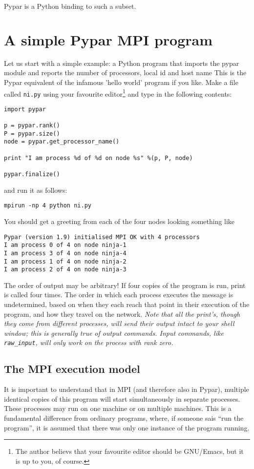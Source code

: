 \documentclass[12pt]{article}
\begin{document}
Pypar is a Python binding to such a subset.


\section{A simple Pypar MPI program}
Let us start with a simple example: a Python program 
that imports the pypar module and 
reports the number of processors, local id and host name
This is the Pypar equivalent of the infamous 'hello world' 
program if you like. 
Make a file called \texttt{ni.py} using your favourite
editor\footnote{The author believs that your favourite editor should 
be GNU/Emacs, but it is up to you, of course.}
and type in the following contents:
{\footnotesize
\begin{verbatim}
import pypar

p = pypar.rank()
P = pypar.size()
node = pypar.get_processor_name()

print "I am process %d of %d on node %s" %(p, P, node)

pypar.finalize()
\end{verbatim}}
\noindent and run it as follows:
\begin{verbatim}
mpirun -np 4 python ni.py
\end{verbatim}
You should get a greeting from each of the four nodes looking 
something like
\begin{verbatim}
Pypar (version 1.9) initialised MPI OK with 4 processors
I am process 0 of 4 on node ninja-1
I am process 3 of 4 on node ninja-4
I am process 1 of 4 on node ninja-2
I am process 2 of 4 on node ninja-3
\end{verbatim}
The order of output may be arbitrary!  If four copies of the
program is run, print is called four times. The order in which each
process executes the message is undetermined, based on when they each
reach that point in their execution of the program, and how they
travel on the network.
\emph{Note that all the print's, though they come from different
  processes, will send their output intact to your shell window; this
  is generally true of output commands.
  Input commands, like \texttt{raw_input},
  will only work on the process with rank zero.}

  
\subsection{The MPI execution model}

It is important to understand that in MPI (and therefore also in 
Pypar), multiple identical copies of this program 
will start simultaneously in separate processes.
These processes may run on one machine or on multiple machines.
This is a fundamental difference from ordinary programs, 
where, if someone sais ``run the program'', it is
assumed that there was only one instance of the program running.
\end{document}
